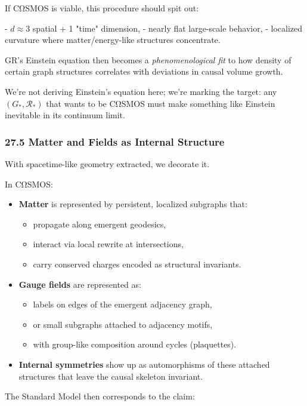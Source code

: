 If CΩSMOS is viable, this procedure should spit out:

- $d \approx 3$ spatial + 1 "time" dimension,
- nearly flat large-scale behavior,
- localized curvature where matter/energy-like structures concentrate.

GR’s Einstein equation then becomes a \emph{phenomenological fit} to how density of certain graph structures correlates with deviations in causal volume growth.

We’re not deriving Einstein’s equation here; we’re marking the target: any $(G_\ast,\mathcal{R}_\ast)$ that wants to be CΩSMOS must make something like Einstein inevitable in its continuum limit.

\subsubsection*{27.5  Matter and Fields as Internal Structure}

With spacetime-like geometry extracted, we decorate it.

In CΩSMOS:

\begin{itemize}
  \item \textbf{Matter} is represented by persistent, localized subgraphs that:
    \begin{itemize}
      \item propagate along emergent geodesics,
      \item interact via local rewrite at intersections,
      \item carry conserved charges encoded as structural invariants.
    \end{itemize}

  \item \textbf{Gauge fields} are represented as:
    \begin{itemize}
      \item labels on edges of the emergent adjacency graph,
      \item or small subgraphs attached to adjacency motifs,
      \item with group-like composition around cycles (plaquettes).
    \end{itemize}

  \item \textbf{Internal symmetries} show up as automorphisms of these attached structures that leave the causal skeleton invariant.
\end{itemize}

The Standard Model then corresponds to the claim:


